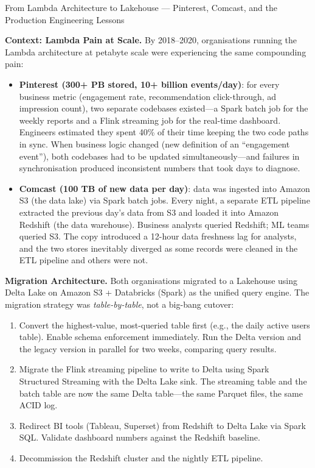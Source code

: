 \begin{casestudy}{From Lambda Architecture to Lakehouse ---
  Pinterest, Comcast, and the Production Engineering Lessons}

\textbf{Context: Lambda Pain at Scale.}
By 2018--2020, organisations running the Lambda architecture at petabyte
scale were experiencing the same compounding pain:
\begin{itemize}
  \item \textbf{Pinterest (300+ PB stored, 10+ billion events/day)}: for
        every business metric (engagement rate, recommendation click-through,
        ad impression count), two separate codebases existed---a Spark batch
        job for the weekly reports and a Flink streaming job for the
        real-time dashboard. Engineers estimated they spent 40\% of their
        time keeping the two code paths in sync. When business logic changed
        (new definition of an ``engagement event''), both codebases had to
        be updated simultaneously---and failures in synchronisation produced
        inconsistent numbers that took days to diagnose.
  \item \textbf{Comcast (100 TB of new data per day)}: data was ingested
        into Amazon S3 (the data lake) via Spark batch jobs. Every night, a
        separate ETL pipeline extracted the previous day's data from S3 and
        loaded it into Amazon Redshift (the data warehouse). Business analysts
        queried Redshift; ML teams queried S3. The copy introduced a 12-hour
        data freshness lag for analysts, and the two stores inevitably diverged
        as some records were cleaned in the ETL pipeline and others were not.
\end{itemize}

\textbf{Migration Architecture.}
Both organisations migrated to a Lakehouse using Delta Lake on Amazon S3 +
Databricks (Spark) as the unified query engine. The migration strategy
was \emph{table-by-table}, not a big-bang cutover:
\begin{enumerate}
  \item Convert the highest-value, most-queried table first (e.g., the
        daily active users table). Enable schema enforcement immediately.
        Run the Delta version and the legacy version in parallel for two
        weeks, comparing query results.
  \item Migrate the Flink streaming pipeline to write to Delta using
        Spark Structured Streaming with the Delta Lake sink. The streaming
        table and the batch table are now the same Delta table---the same
        Parquet files, the same ACID log.
  \item Redirect BI tools (Tableau, Superset) from Redshift to Delta Lake
        via Spark SQL. Validate dashboard numbers against the Redshift
        baseline.
  \item Decommission the Redshift cluster and the nightly ETL pipeline.
\end{enumerate}


\end{casestudy}
